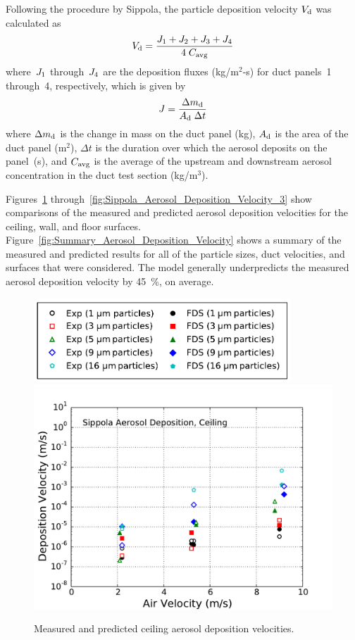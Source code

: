Following the procedure by Sippola, the particle deposition velocity $V\sb{d}$ was calculated as
\begin{equation}
V\sb{d} = \frac{J\sb{1} + J\sb{2} + J\sb{3} + J\sb{4}}{4 \; C\sb{avg}}
\label{eq:sippola_deposition_velocity}
\end{equation}
where~$J\sb{1}$ through~$J\sb{4}$ are the deposition fluxes (kg/m$^2$-s) for duct panels~1 through~4, respectively, which is given by
\begin{equation}
J = \frac{\Delta m\sb{d}}{A\sb{d} \; \Delta t}
\label{eq:sippola_deposition_flux}
\end{equation}
where $\Delta m\sb{d}$ is the change in mass on the duct panel (kg), $A\sb{d}$ is the area of the duct panel (m$^2$), $\Delta t$ is the duration over which the aerosol deposits on the panel~(s), and $C\sb{avg}$ is the average of the upstream and downstream aerosol concentration in the duct test section (kg/m$^3$).

Figures~\ref{fig:Sippola_Aerosol_Deposition_Velocity_1} through~\ref{fig:Sippola_Aerosol_Deposition_Velocity_3} show comparisons of the measured and predicted aerosol deposition velocities for the ceiling, wall, and floor surfaces. Figure~\ref{fig:Summary_Aerosol_Deposition_Velocity} shows a summary of the measured and predicted results for all of the particle sizes, duct velocities, and surfaces that were considered. The model generally underpredicts the measured aerosol deposition velocity by 45~\%, on average.

\begin{figure}[p]
\centering
\includegraphics[width=3.8in]{Fig_Sippola_Aerosol_Deposition_Legend.pdf} \\
\includegraphics[width=5.0in]{Fig_Sippola_Aerosol_Ceiling_Deposition.pdf}
\caption[Ceiling aerosol deposition velocities]
{Measured and predicted ceiling aerosol deposition velocities.}
\label{fig:Sippola_Aerosol_Deposition_Velocity_1}
\end{figure}

